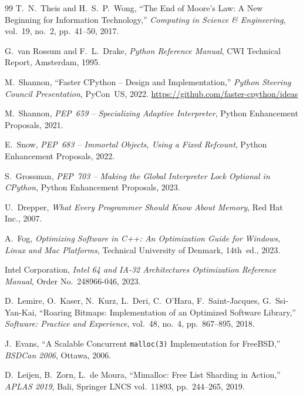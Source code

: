 ﻿\documentclass[a4paper,12pt]{scrreprt}
\theoremstyle{definition}
\begin{document}
\begin{thebibliography}{99}
		T.~N.~Theis and H.~S.~P.~Wong,
		``The End of Moore's Law: A New Beginning for Information Technology,''
		\textit{Computing in Science \& Engineering}, vol.~19, no.~2, pp.~41--50, 2017.
		
		G.~van Rossum and F.~L.~Drake,
		\textit{Python Reference Manual},
		CWI Technical Report, Amsterdam, 1995.
		
		M.~Shannon,
		``Faster CPython -- Design and Implementation,''
		\textit{Python Steering Council Presentation}, PyCon~US, 2022.
		\url{https://github.com/faster-cpython/ideas}
		
		M.~Shannon,
		\textit{PEP~659 -- Specializing Adaptive Interpreter},
		Python Enhancement Proposals, 2021.
		
		E.~Snow,
		\textit{PEP~683 -- Immortal Objects, Using a Fixed Refcount},
		Python Enhancement Proposals, 2022.
		
		S.~Grossman,
		\textit{PEP~703 -- Making the Global Interpreter Lock Optional in CPython},
		Python Enhancement Proposals, 2023.
		
		U.~Drepper,
		\textit{What Every Programmer Should Know About Memory},
		Red Hat Inc., 2007.
		
		A.~Fog,
		\textit{Optimizing Software in C++: An Optimization Guide for Windows,
			Linux and Mac Platforms},
		Technical University of Denmark, 14th~ed., 2023.
		
		Intel Corporation,
		\textit{Intel 64 and IA-32 Architectures Optimization Reference Manual},
		Order No.~248966-046, 2023.
		
		D.~Lemire, O.~Kaser, N.~Kurz, L.~Deri, C.~O'Hara, F.~Saint-Jacques,
		G.~Ssi-Yan-Kai,
		``Roaring Bitmaps: Implementation of an Optimized Software Library,''
		\textit{Software: Practice and Experience}, vol.~48, no.~4, pp.~867--895,
		2018.
		
		J.~Evans,
		``A Scalable Concurrent \texttt{malloc(3)} Implementation for FreeBSD,''
		\textit{BSDCan 2006}, Ottawa, 2006.
		
		D.~Leijen, B.~Zorn, L.~de Moura,
		``Mimalloc: Free List Sharding in Action,''
		\textit{APLAS 2019}, Bali, Springer LNCS vol.~11893, pp.~244--265, 2019.
		

\end{thebibliography}
\end{document}
